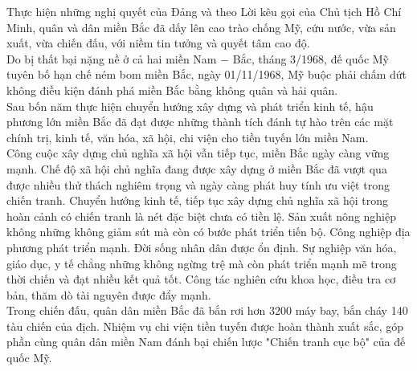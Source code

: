 Thực hiện những nghị quyết của Đảng và theo Lời kêu gọi của Chủ tịch Hồ Chí Minh, quân và dân miền Bắc đã dấy lên cao trào chống Mỹ, cứu nước, vừa sản xuất, vừa chiến đấu, với niềm tin tưởng và quyết tâm cao độ.\\
Do bị thất bại nặng nề ở cả hai miền Nam $-$ Bắc, tháng 3/1968, đế quốc Mỹ tuyên bố hạn chế ném bom miền Bắc, ngày 01/11/1968, Mỹ buộc phải chấm dứt không điều kiện đánh phá miền Bắc bằng không quân và hải quân.\\
Sau bốn năm thực hiện chuyển hướng xây dựng và phát triển kinh tế, hậu phương lớn miền Bắc đã đạt được những thành tích đánh tự hào trên các mặt chính trị, kinh tế, văn hóa, xã hội, chi viện cho tiền tuyến lớn miền Nam.\\
Công cuộc xây dựng chủ nghĩa xã hội vẫn tiếp tục, miền Bắc ngày càng vững mạnh. Chế độ xã hội chủ nghĩa đang được xây dựng ở miền Bắc đã vượt qua được nhiều thử thách nghiêm trọng và ngày càng phát huy tính ưu việt trong chiến tranh. Chuyển hướng kinh tế, tiếp tục xây dựng chủ nghĩa xã hội trong hoàn cảnh có chiến tranh là nét đặc biệt chưa có tiền lệ. Sản xuất nông nghiệp không những không giảm sút mà còn có bước phát triển tiến bộ. Công nghiệp địa phương phát triển mạnh. Đời sống nhân dân được ổn định. Sự nghiệp văn hóa, giáo dục, y tế chẳng những không ngừng trệ mà còn phát triển mạnh mẽ trong thời chiến và đạt nhiều kết quả tốt. Công tác nghiên cứu khoa học, điều tra cơ bản, thăm dò tài nguyên được đẩy mạnh. \\
Trong chiến đấu, quân dân miền Bắc đã bắn rơi hơn 3200 máy bay, bắn cháy 140 tàu chiến của địch. Nhiệm vụ chi viện tiền tuyến được hoàn thành xuất sắc, góp phần cùng quân dân miền Nam đánh bại chiến lược "Chiến tranh cục bộ" của đế quốc Mỹ.

